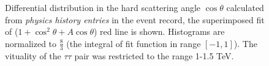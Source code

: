 \documentclass{article}
\begin{document}
\begin{figure}[h!]
\centering 
{}
 \caption{\label{A-fit}  Differential distribution in the hard scattering 
angle $\cos \theta$ calculated from {\it physics history entries} in the event record,
 the superimposed  fit of   ($1+\cos^2 \theta + A \cos \theta$) red line 
is shown.
Histograms are normalized to $\frac{8}{3}$ (the integral of fit function in range $[-1,1]$).
 The vituality of the $\tau \tau$ pair was restricted to the range 1-1.5 TeV.}
\end{figure}
\end{document}
